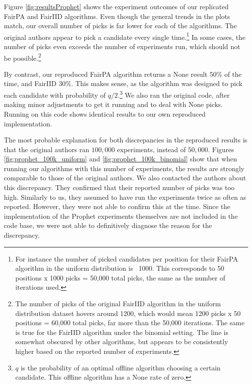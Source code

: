 Figure \ref{fig:resultsProphet} shows the experiment outcomes of our replicated FairPA and FairIID algorithms. Even though the general trends in the plots match, our overall number of picks is far lower for each of the algorithms. The original authors appear to pick a candidate every single time.\footnote{For instance the number of picked candidates per position  for their FairPA algorithm in the uniform distribution is ~1000. This corresponds to 50 positions x 1000 picks = 50,000 total picks, the same as the number of iterations used.} In some cases, the number of picks even exceeds the number of experiments run, which should not be possible.\footnote{The number of picks of the original FairIID algorithm in the uniform distribution dataset hovers around 1200, which would mean 1200 picks x 50 positions = 60,000 total picks, far more than the 50,000 iterations.  The same is true for the FairIID algorithm under the binomial setting. The line is somewhat obscured by other algorithms, but appears to be consistently higher based on the reported number of experiments.}

By contrast, our reproduced FairPA algorithm returns a None result 50\% of the time, and FairIID 30\%. This makes sense, as the algorithm was designed to pick each candidate with probability of $q/2$.\footnote{$q$ is the probability of an optimal offline algorithm choosing a certain candidate. This offline algorithm has a None rate of zero.} We also ran the original code, after making minor adjustments to get it running and to deal with None picks. Running on this code shows identical results to our own reproduced implementation.

The most probable explanation for both discrepancies in the reproduced results is that the original authors ran $100,000$ experiments, instead of $50,000$. Figures \ref{fig:prophet_100k_uniform} and \ref{fig:prophet_100k_binomial} show that when running our algorithms with this number of experiments, the results are strongly comparable to those of the original authors. We also contacted the authors about this discrepancy. They confirmed that their reported number of picks was too high. Similarly to us, they assumed to have run the experiments twice as often as reported. However, they were not able to confirm this at the time. Since the implementation of the Prophet experiments themselves are not included in the code base, we were not able to definitively diagnose the reason for the discrepancy.


